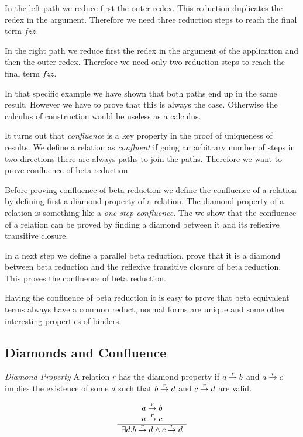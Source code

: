 In the left path we reduce first the outer redex. This reduction duplicates the
redex in the argument. Therefore we need three reduction steps to reach the
final term $f z z$.

In the right path we reduce first the redex in the argument of the application
and then the outer redex. Therefore we need only two reduction steps to reach
the final term $f z z$.

In that specific example we have shown that both paths end up in the same
result. However we have to prove that this is always the case. Otherwise the
calculus of construction would be useless as a calculus.

It turns out that \emph{confluence} is a key property in the proof of uniqueness
of results. We define a relation as \emph{confluent} if going an arbitrary
number of steps in two directions there are always paths to join the paths.
Therefore we want to prove confluence of beta reduction.

Before proving confluence of beta reduction we define the confluence of a
relation by defining first a diamond property of a relation. The diamond
property of a relation is something like a \emph{one step confluence}. The we
show that the confluence of a relation can be proved by finding a diamond
between it and its reflexive transitive closure.

In a next step we define a parallel beta reduction, prove that it is a diamond
between beta reduction and the reflexive transitive closure of beta reduction.
This proves the confluence of beta reduction.

Having the confluence of beta reduction it is easy to prove that beta equivalent
terms always have a common reduct, normal forms are unique and some other
interesting properties of binders.


\subsection{Diamonds and Confluence}


\begin{definition}
    \emph{Diamond Property} A relation $r$ has the diamond property if $a
    \stackrel{r}{\to} b$ and $a \stackrel{r}{\to} c$ implies the existence of some $d$ such that
    $b \stackrel{r}{\to} d$ and $c \stackrel{r}{\to} d$ are valid.

    $$
    \begin{array}{c} 
        a \stackrel{r}{\to} b
        \\
        a \stackrel{r}{\to} c
     \\ \hline 
        \exists d. b \stackrel{r}{\to} d \land c \stackrel{r}{\to} d
    \end{array}
    $$
\end{definition}

